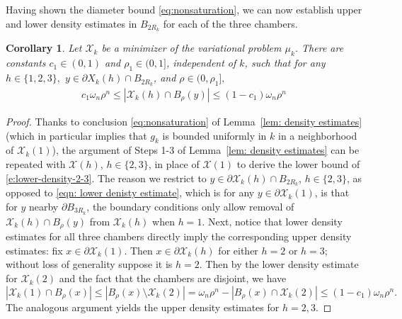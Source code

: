 \documentclass[10pt,reqno]{amsart}
\numberwithin{equation}{section}
\newtheorem{corollary}[theorem]{Corollary}
\theoremstyle{definition}
\newcommand{\X}{\mathcal{X}}
\begin{document}
{{ 
Having shown the diameter bound \eqref{eq:nonsaturation}, we can now establish upper and lower density estimates in $B_{2R_k}$ for each of the three chambers.
\begin{corollary}\label{cor: more density estimates}
    Let $\mathcal{X}_{k}$ be a minimizer of the variational problem $\mu_{k}$. 
    There are constants $c_1\in (0,1)$ and $\rho_1\in (0,1]$, independent of $k$, such that for any $h \in \{1,2,3\},$ $y \in \partial X_k(h) \cap B_{2R_k}$, and $\rho \in (0,\rho_1],$
        \begin{align}
c_1 \omega_n\rho^n    \leq  |\X_k(h) \cap B_\rho(y)| \leq (1-c_1)\omega_n \rho^n \label{e:lower-density-2-3}
        \end{align} 
\end{corollary}
\begin{proof}
    Thanks to conclusion \eqref{eq:nonsaturation} of Lemma~\ref{lem: density estimates} {(which in particular implies that $g_k$ is bounded uniformly in $k$ in a neighborhood of $\X_k(1)$)}, the argument of Steps 1-3 of Lemma~\ref{lem: density estimates} can be repeated with $\X(h)$, {$h\in \{2,3\}$,} in place of $\X(1)$ to derive the lower bound of \eqref{e:lower-density-2-3}. The reason we restrict to $y\in \partial \X_k(h) \cap B_{2R_k}$, $h\in \{2,3\}$, as opposed to \eqref{eqn: lower denisty estimate}, which is for any $y\in \partial \X_k(1)$, is that for $y$ nearby $\partial B_{3R_k}$, the boundary conditions only allow removal of $\X_k(h)\cap B_\rho(y)$ from {$\X_k(h)$} when $h=1$.  Next, notice that lower density estimates for all three chambers directly imply the corresponding upper density estimates: fix $x \in {\partial} \X_k(1).$ Then  $x \in {\partial} \X_k(h)$ for either $h=2$ or $h=3$; without loss of generality suppose it is $h=2.$ Then by the lower density estimate for $\X_k(2)$ and the fact that the chambers are disjoint, we have 
    \[
    |\X_k(1)\cap B_\rho(x)| \leq | B_\rho(x) \setminus \X_k(2)| = \omega_n\rho^n - |B_\rho(x) \cap \X_k(2)| \leq  (1-c_1)\omega_n\rho^n. 
    \]
    The analogous argument yields the upper density estimates for $h=2,3.$
\end{proof}
}

}
\end{document}
